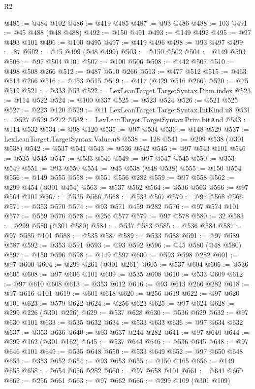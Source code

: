 \begin{lexlean}{R2}
\begin{coremodule}
@485 := @484 @102
@486 := @419 @485
@487 := @93 @486
@488 := 103
@491 := @45 @488 (@48 @488)
@492 := @150 @491
@493 := @149 @492
@495 := @97 @493 @101
@496 := @100 @495
@497 := @419 @496
@498 := @93 @497
@499 := 87
@502 := @45 @499 (@48 @499)
@503 := @150 @502
@504 := @149 @503
@506 := @97 @504 @101
@507 := @100 @506
@508 := @442 @507
@510 := @498 @508 @266
@512 := @487 @510 @266
@513 := @477 @512
@515 := @463 @513 @266
@516 := @453 @515
@519 := @417 (@429 @516 @266)
@520 := @75 @519
@521 := @333 @53
@522 := LexLeanTarget.TargetSyntax.Prim.index
@523 := @114 @522
@524 := @100 @337
@525 := @523 @524
@526 := @521 @525
@527 := @223 @120
@529 := @11 LexLeanTarget.TargetSyntax.IntKind.u8
@531 := @527 @529 @272
@532 := LexLeanTarget.TargetSyntax.Prim.bitAnd
@533 := @114 @532
@534 := @98 @120
@535 := @97 @534
@536 := @148 @529
@537 := LexLeanTarget.TargetSyntax.Value.u8
@538 := 128
@541 := @299 @538 (@301 @538)
@542 := @537 @541
@543 := @536 @542
@545 := @97 @543 @101
@546 := @535 @545
@547 := @533 @546
@549 := @97 @547 @545
@550 := @353 @549
@551 := @93 @550
@554 := @45 @538 (@48 @538)
@555 := @150 @554
@556 := @149 @555
@558 := @551 @556 @282
@559 := @97 @558
@562 := @299 @454 (@301 @454)
@563 := @537 @562
@564 := @536 @563
@566 := @97 @564 @101
@567 := @535 @566
@568 := @533 @567
@570 := @97 @568 @566
@571 := @353 @570
@574 := @93 @571 @459 @282
@576 := @97 @574 @101
@577 := @559 @576
@578 := @256 @577
@579 := @97 @578
@580 := 32
@583 := @299 @580 (@301 @580)
@584 := @537 @583
@585 := @536 @584
@587 := @97 @585 @101
@588 := @535 @587
@589 := @533 @588
@591 := @97 @589 @587
@592 := @353 @591
@593 := @93 @592
@596 := @45 @580 (@48 @580)
@597 := @150 @596
@598 := @149 @597
@600 := @593 @598 @282
@601 := @97 @600
@604 := @299 @261 (@301 @261)
@605 := @537 @604
@606 := @536 @605
@608 := @97 @606 @101
@609 := @535 @608
@610 := @533 @609
@612 := @97 @610 @608
@613 := @353 @612
@616 := @93 @613 @266 @282
@618 := @97 @616 @101
@619 := @601 @618
@620 := @256 @619
@622 := @97 @620 @101
@623 := @579 @622
@624 := @256 @623
@625 := @97 @624
@628 := @299 @226 (@301 @226)
@629 := @537 @628
@630 := @536 @629
@632 := @97 @630 @101
@633 := @535 @632
@634 := @533 @633
@636 := @97 @634 @632
@637 := @353 @636
@640 := @93 @637 @244 @282
@641 := @97 @640
@644 := @299 @162 (@301 @162)
@645 := @537 @644
@646 := @536 @645
@648 := @97 @646 @101
@649 := @535 @648
@650 := @533 @649
@652 := @97 @650 @648
@653 := @353 @652
@654 := @93 @653
@655 := @150 @165
@656 := @149 @655
@658 := @654 @656 @282
@660 := @97 @658 @101
@661 := @641 @660
@662 := @256 @661
@663 := @97 @662
@666 := @299 @109 (@301 @109)

\end{coremodule}
\end{lexlean}
